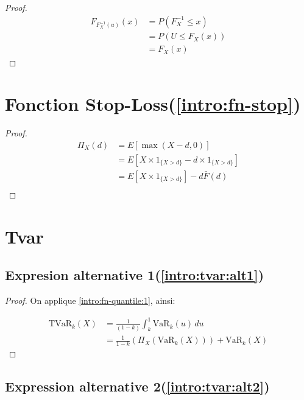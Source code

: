 \documentclass[]{book}
\theoremstyle{definition}
\theoremstyle{definition}
\theoremstyle{definition}
\theoremstyle{remark}
\let\BeginKnitrBlock\begin \let\EndKnitrBlock\end
\begin{document}
\label{preuves:fn-quantile} \BeginKnitrBlock{proof}

\iffalse{} {Proof. } \fi{}

\begin{align*}
F_{F_X^{-1}(u)}(x)& =P(F_X^{-1} \le x)\\
& =P(U \le F_X(x))\\
& =F_X(x)
\end{align*}
\EndKnitrBlock{proof}

\section{Fonction
Stop-Loss(\ref{intro:fn-stop})}\label{fonction-stop-lossrefintrofn-stop}

\label{preuves:fn-stop} \BeginKnitrBlock{proof}

\iffalse{} {Proof. } \fi{}

\begin{align*}
\Pi_X(d)& = E[\max(X-d, 0)]\\
& =E\left[X \times \mathrm{1}_{ \{X > d\} } -d\times \mathrm{1}_{\{X > d\}}\right]\\
& =E\left[X \times \mathrm{1}_{\{X > d\}}\right]-d \bar{F}(d)\\
\end{align*}
\EndKnitrBlock{proof}

\section{Tvar}\label{tvar-1}

\subsection{Expresion alternative
1(\ref{intro:tvar:alt1})}\label{expresion-alternative-1refintrotvaralt1}

\label{preuves:tvar:1} \BeginKnitrBlock{proof}

\iffalse{} {Proof. } \fi{}On applique \ref{intro:fn-quantile:1}, ainsi:

\begin{align*}
\text{TVaR}_k(X)& =\frac{1}{(1-k)}\int_k^1\text{VaR}_k(u)\,du\\
& =\frac{1}{1-k}\left(\Pi_X(\text{VaR}_k(X))\right)+\text{VaR}_k(X)
\end{align*}
\EndKnitrBlock{proof}

\subsection{Expression alternative
2(\ref{intro:tvar:alt2})}\label{expression-alternative-2refintrotvaralt2}
\end{document}
